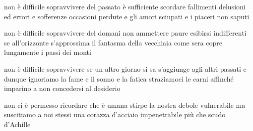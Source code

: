 \begin{poem}
	\begin{stanza}
		non è difficile sopravvivere\verseline
		del passato è sufficiente\verseline
		scordare fallimenti delusioni\verseline
		ed errori e sofferenze\verseline
		occasioni perdute e gli amori\verseline
		sciupati e i piaceri non saputi
	\end{stanza}

	\begin{stanza}
		non è difficile sopravvivere\verseline
		del domani non ammettere paure\verseline
		esibirsi indifferenti se all’orizzonte\verseline
		s’approssima il fantasma della vecchiaia\verseline
		come sera copre lungamente\verseline
		i passi dei monti
	\end{stanza}

	\begin{stanza}
		non è difficile sopravvivere\verseline
		se un altro giorno si sa\verseline
		s’aggiunge agli altri passati\verseline
                e dunque ignoriamo la fame\verseline
                e il sonno e la fatica\verseline
                straziamoci le carni\verseline
                affinché imparino a non concedersi\verseline
                al desiderio
	\end{stanza}

	\begin{stanza}
                non ci è permesso ricordare\verseline
                che è umana stirpe la nostra\verseline
                debole vulnerabile\verseline
                ma suscitiamo a noi stessi\verseline
                una corazza d'acciaio\verseline
                impenetrabile più che scudo d'Achille
	\end{stanza}
\end{poem}

\clearpage


